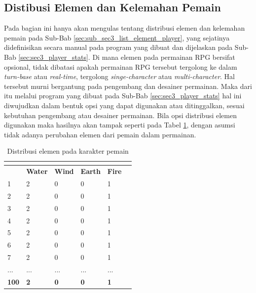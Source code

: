 \subsection{Distibusi Elemen dan Kelemahan Pemain}
\label{sec:sub_sec4_eval_dist_element_single-character}
\vspace{1ex}

Pada bagian ini hanya akan mengulas tentang distribusi elemen dan kelemahan pemain pada Sub-Bab \ref{sec:sub_sec3_list_element_player}, yang sejatinya didefinisikan secara manual pada program yang dibuat dan dijelaskan pada Sub-Bab \ref{sec:sec3_player_stats}. Di mana elemen pada permainan RPG bersifat opsional, tidak dibatasi apakah permainan RPG tersebut tergolong ke dalam \textit{turn-base} atau \textit{real-time}, tergolong \textit{singe-character} atau \textit{multi-character}. Hal tersebut murni bergantung pada pengembang dan desainer permainan. Maka dari itu melalui program yang dibuat pada Sub-Bab \ref{sec:sec3_player_stats} hal ini diwujudkan dalam bentuk opsi yang dapat digunakan atau ditinggalkan, sesuai kebutuhan pengembang atau desainer permainan. Bila opsi distribusi elemen digunakan maka hasilnya akan tampak seperti pada Tabel \ref{tb:player_element}, dengan asumsi tidak adanya perubahan elemen dari pemain dalam permainan.
\vspace{-1ex}

\begin{longtable}{|l|l|l|l|l|l|}
	\caption{Distribusi elemen pada karakter pemain}
	\vspace{1ex}
	\label{tb:player_element}\\
	\hline
	\rowcolor[HTML]{C0C0C0} 
	\multicolumn{1}{|c|}{\cellcolor[HTML]{C0C0C0}\textbf{Levels}} & \multicolumn{1}{c|}{\cellcolor[HTML]{C0C0C0}\textbf{Water}} & \multicolumn{1}{c|}{\cellcolor[HTML]{C0C0C0}\textbf{Wind}} & \multicolumn{1}{c|}{\cellcolor[HTML]{C0C0C0}\textbf{Earth}} & \multicolumn{1}{c|}{\cellcolor[HTML]{C0C0C0}\textbf{Fire}} \\ \hline
	1 & 2 & 0 & 0 & 1 \\ \hline
	2 & 2 & 0 & 0 & 1 \\ \hline
	3 & 2 & 0 & 0 & 1 \\ \hline
	4 & 2 & 0 & 0 & 1 \\ \hline
	5 & 2 & 0 & 0 & 1 \\ \hline
	6 & 2 & 0 & 0 & 1 \\ \hline
	7 & 2 & 0 & 0 & 1 \\ \hline
	... & ... & ... & ... & ... \\ \hline
	\textbf{100} & \textbf{2} & \textbf{0} & \textbf{0} & \textbf{1} \\ \hline
\end{longtable}

